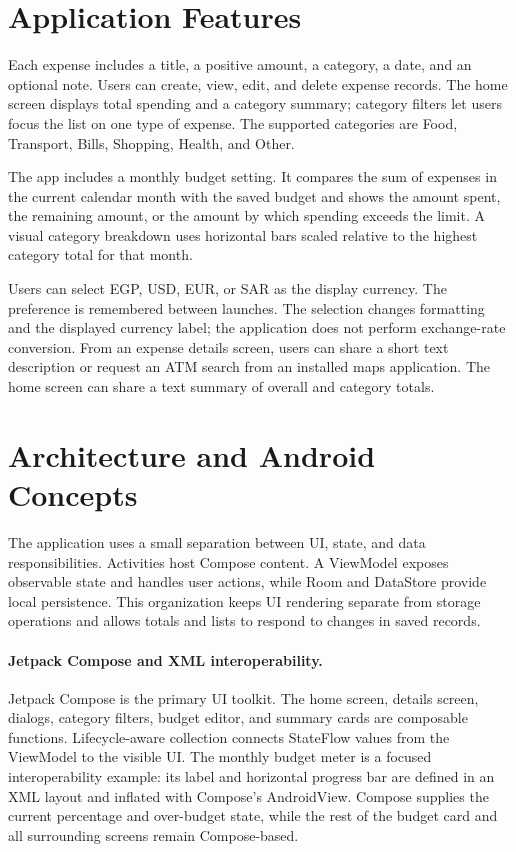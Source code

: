 \documentclass[sigconf,nonacm]{acmart}
\begin{document}
\section{Application Features}
Each expense includes a title, a positive amount, a category, a date, and an optional note. Users can create, view, edit, and delete expense records. The home screen displays total spending and a category summary; category filters let users focus the list on one type of expense. The supported categories are Food, Transport, Bills, Shopping, Health, and Other.

The app includes a monthly budget setting. It compares the sum of expenses in the current calendar month with the saved budget and shows the amount spent, the remaining amount, or the amount by which spending exceeds the limit. A visual category breakdown uses horizontal bars scaled relative to the highest category total for that month.

Users can select EGP, USD, EUR, or SAR as the display currency. The preference is remembered between launches. The selection changes formatting and the displayed currency label; the application does not perform exchange-rate conversion. From an expense details screen, users can share a short text description or request an ATM search from an installed maps application. The home screen can share a text summary of overall and category totals.

\section{Architecture and Android Concepts}
The application uses a small separation between UI, state, and data responsibilities. Activities host Compose content. A ViewModel exposes observable state and handles user actions, while Room and DataStore provide local persistence. This organization keeps UI rendering separate from storage operations and allows totals and lists to respond to changes in saved records.

\paragraph{Jetpack Compose and XML interoperability.} Jetpack Compose is the primary UI toolkit. The home screen, details screen, dialogs, category filters, budget editor, and summary cards are composable functions. Lifecycle-aware collection connects StateFlow values from the ViewModel to the visible UI. The monthly budget meter is a focused interoperability example: its label and horizontal progress bar are defined in an XML layout and inflated with Compose's AndroidView. Compose supplies the current percentage and over-budget state, while the rest of the budget card and all surrounding screens remain Compose-based.
\end{document}
